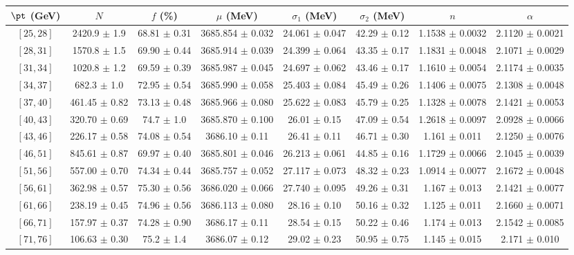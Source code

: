 \begin{tabular}{c||c|c|c|c|c|c|c}
$\pt$ (GeV) & $N$ & $f$ (\%) & $\mu$ (MeV) & $\sigma_1$ (MeV) & $\sigma_2$ (MeV) & $n$ & $\alpha$ \\
\hline
$[25, 28]$ & 2420.9 $\pm$ 1.9 & 68.81 $\pm$ 0.31 & 3685.854 $\pm$ 0.032 & 24.061 $\pm$ 0.047 & 42.29 $\pm$ 0.12 & 1.1538 $\pm$ 0.0032 & 2.1120 $\pm$ 0.0021\\
$[28, 31]$ & 1570.8 $\pm$ 1.5 & 69.90 $\pm$ 0.44 & 3685.914 $\pm$ 0.039 & 24.399 $\pm$ 0.064 & 43.35 $\pm$ 0.17 & 1.1831 $\pm$ 0.0048 & 2.1071 $\pm$ 0.0029\\
$[31, 34]$ & 1020.8 $\pm$ 1.2 & 69.59 $\pm$ 0.39 & 3685.987 $\pm$ 0.045 & 24.697 $\pm$ 0.062 & 43.46 $\pm$ 0.17 & 1.1610 $\pm$ 0.0054 & 2.1174 $\pm$ 0.0035\\
$[34, 37]$ & 682.3 $\pm$ 1.0 & 72.95 $\pm$ 0.54 & 3685.990 $\pm$ 0.058 & 25.403 $\pm$ 0.084 & 45.49 $\pm$ 0.26 & 1.1406 $\pm$ 0.0075 & 2.1308 $\pm$ 0.0048\\
$[37, 40]$ & 461.45 $\pm$ 0.82 & 73.13 $\pm$ 0.48 & 3685.966 $\pm$ 0.080 & 25.622 $\pm$ 0.083 & 45.79 $\pm$ 0.25 & 1.1328 $\pm$ 0.0078 & 2.1421 $\pm$ 0.0053\\
$[40, 43]$ & 320.70 $\pm$ 0.69 & 74.7 $\pm$ 1.0 & 3685.870 $\pm$ 0.100 & 26.01 $\pm$ 0.15 & 47.09 $\pm$ 0.54 & 1.2618 $\pm$ 0.0097 & 2.0928 $\pm$ 0.0066\\
$[43, 46]$ & 226.17 $\pm$ 0.58 & 74.08 $\pm$ 0.54 & 3686.10 $\pm$ 0.11 & 26.41 $\pm$ 0.11 & 46.71 $\pm$ 0.30 & 1.161 $\pm$ 0.011 & 2.1250 $\pm$ 0.0076\\
$[46, 51]$ & 845.61 $\pm$ 0.87 & 69.97 $\pm$ 0.40 & 3685.801 $\pm$ 0.046 & 26.213 $\pm$ 0.061 & 44.85 $\pm$ 0.16 & 1.1729 $\pm$ 0.0066 & 2.1045 $\pm$ 0.0039\\
$[51, 56]$ & 557.00 $\pm$ 0.70 & 74.34 $\pm$ 0.44 & 3685.757 $\pm$ 0.052 & 27.117 $\pm$ 0.073 & 48.32 $\pm$ 0.23 & 1.0914 $\pm$ 0.0077 & 2.1672 $\pm$ 0.0048\\
$[56, 61]$ & 362.98 $\pm$ 0.57 & 75.30 $\pm$ 0.56 & 3686.020 $\pm$ 0.066 & 27.740 $\pm$ 0.095 & 49.26 $\pm$ 0.31 & 1.167 $\pm$ 0.013 & 2.1421 $\pm$ 0.0077\\
$[61, 66]$ & 238.19 $\pm$ 0.45 & 74.96 $\pm$ 0.56 & 3686.113 $\pm$ 0.080 & 28.16 $\pm$ 0.10 & 50.16 $\pm$ 0.32 & 1.125 $\pm$ 0.011 & 2.1660 $\pm$ 0.0071\\
$[66, 71]$ & 157.97 $\pm$ 0.37 & 74.28 $\pm$ 0.90 & 3686.17 $\pm$ 0.11 & 28.54 $\pm$ 0.15 & 50.22 $\pm$ 0.46 & 1.174 $\pm$ 0.013 & 2.1542 $\pm$ 0.0085\\
$[71, 76]$ & 106.63 $\pm$ 0.30 & 75.2 $\pm$ 1.4 & 3686.07 $\pm$ 0.12 & 29.02 $\pm$ 0.23 & 50.95 $\pm$ 0.75 & 1.145 $\pm$ 0.015 & 2.171 $\pm$ 0.010\\

\end{tabular}
